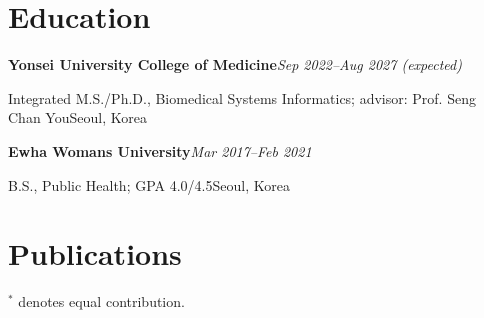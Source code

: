 \documentclass[9pt,letterpaper]{extarticle}
\newcommand{\head}[2]{\textbf{#1}\hfill\textit{#2}\par}
\newcommand{\subhead}[2]{#1\hfill #2\par}
\begin{document}
\section{Education}
\head{Yonsei University College of Medicine}{Sep 2022--Aug 2027 (expected)}
\subhead{Integrated M.S./Ph.D., Biomedical Systems Informatics; advisor: Prof. Seng Chan You}{Seoul, Korea}
\vspace{2pt}
\head{Ewha Womans University}{Mar 2017--Feb 2021}
\subhead{B.S., Public Health; GPA 4.0/4.5}{Seoul, Korea}

\section{Publications}
$^*$ denotes equal contribution.\par\vspace{2pt}
\end{document}
